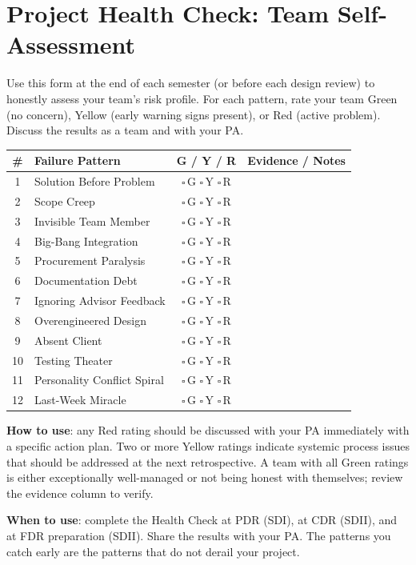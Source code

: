 \section*{Project Health Check: Team Self-Assessment}
Use this form at the end of each semester (or before each design review) to honestly assess your team's risk profile. For each pattern, rate your team Green (no concern), Yellow (early warning signs present), or Red (active problem). Discuss the results as a team and with your PA.

\begin{center}\small
\begin{longtable}{c p{3.8cm} c p{5.5cm}}
\toprule
\textbf{\#} & \textbf{Failure Pattern} & \textbf{G / Y / R} & \textbf{Evidence / Notes} \\
\midrule
\endhead
1 & Solution Before Problem & $\square$\,G $\square$\,Y $\square$\,R & \\[0.4cm]
2 & Scope Creep & $\square$\,G $\square$\,Y $\square$\,R & \\[0.4cm]
3 & Invisible Team Member & $\square$\,G $\square$\,Y $\square$\,R & \\[0.4cm]
4 & Big-Bang Integration & $\square$\,G $\square$\,Y $\square$\,R & \\[0.4cm]
5 & Procurement Paralysis & $\square$\,G $\square$\,Y $\square$\,R & \\[0.4cm]
6 & Documentation Debt & $\square$\,G $\square$\,Y $\square$\,R & \\[0.4cm]
7 & Ignoring Advisor Feedback & $\square$\,G $\square$\,Y $\square$\,R & \\[0.4cm]
8 & Overengineered Design & $\square$\,G $\square$\,Y $\square$\,R & \\[0.4cm]
9 & Absent Client & $\square$\,G $\square$\,Y $\square$\,R & \\[0.4cm]
10 & Testing Theater & $\square$\,G $\square$\,Y $\square$\,R & \\[0.4cm]
11 & Personality Conflict Spiral & $\square$\,G $\square$\,Y $\square$\,R & \\[0.4cm]
12 & Last-Week Miracle & $\square$\,G $\square$\,Y $\square$\,R & \\[0.4cm]
\bottomrule
\end{longtable}
\end{center}

\textbf{How to use}: any Red rating should be discussed with your PA immediately with a specific action plan. Two or more Yellow ratings indicate systemic process issues that should be addressed at the next retrospective. A team with all Green ratings is either exceptionally well-managed or not being honest with themselves; review the evidence column to verify.

\textbf{When to use}: complete the Health Check at PDR (SDI), at CDR (SDII), and at FDR preparation (SDII). Share the results with your PA. The patterns you catch early are the patterns that do not derail your project.
